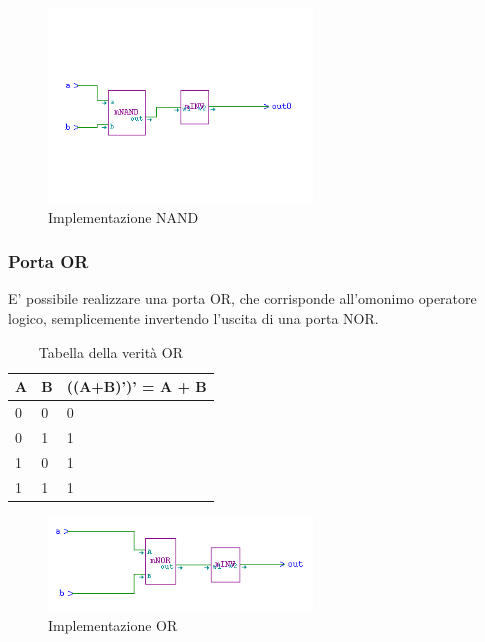 \documentclass[10pt]{article}
\begin{document}
\begin{itemize}
    \begin{figure}[ht]
    \begin{minipage}[b]{0.4\textwidth}
    
    \includegraphics[width=70mm]{and}
    \caption{Implementazione NAND}
    \label{ }
    \end{minipage}
    \end{figure}

\subsubsection{Porta OR}
E' possibile realizzare una porta OR, che corrisponde all'omonimo operatore logico, semplicemente invertendo l'uscita di una porta NOR.

    \begin{table}[H]
        \begin{minipage}[b]{0.4\textwidth}
        \centering
        \begin{tabular}{|ll|l|}
            \hline
            \textbf{A} & \textbf{B} & \textbf{((A+B)')' = A + B} \\ \hline
            0          & 0          & 0          \\ \hline
            0          & 1          & 1          \\ 
            1          & 0          & 1          \\ 
            1          & 1          & 1          \\ \hline
            \end{tabular}
            \caption{Tabella della verità OR}
            \label{table:student}
        \end{minipage}
        \end{table}
        
        \begin{figure}[ht]
        \begin{minipage}[b]{0.4\textwidth}
        
        \includegraphics[width=70mm]{or}
        \caption{Implementazione OR}
        \label{ }
        \end{minipage}
        \end{figure}


\end{itemize}
\end{document}
